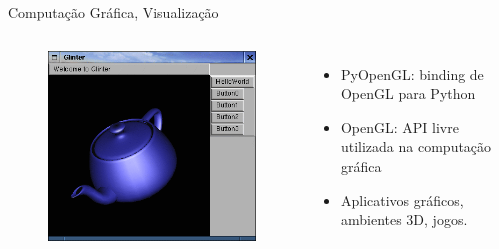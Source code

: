 \documentclass[12pt,t,graphics]{beamer}
\begin{document}
\begin{frame}[t]{Computação Gráfica, Visualização}
\begin{columns}
\begin{figure}
			\hspace{0.1cm}
			\includegraphics[scale=0.2]{img/pyogl.png}
		\end{figure}
		\begin{itemize}
			\item PyOpenGL: binding de OpenGL para Python
			\item OpenGL: API livre utilizada na computação gráfica
			\item Aplicativos gráficos, ambientes 3D, jogos.
		\end{itemize}
		
	\end{columns}
	
\end{frame}
\end{document}
